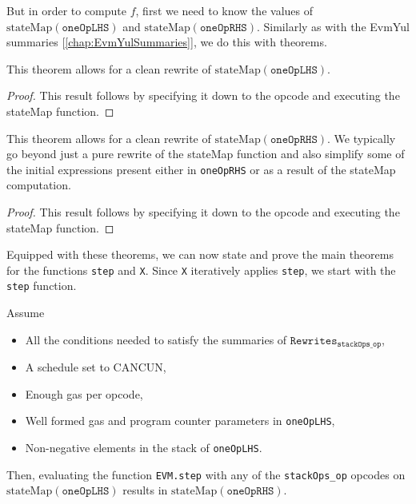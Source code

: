 But in order to compute $f$, first we need to know the values of
$\text{stateMap}(\texttt{oneOpLHS})$ and $\text{stateMap}(\texttt{oneOpRHS})$.
Similarly as with the EvmYul summaries [\ref{chap:EvmYulSummaries}], we do this
with theorems.

\begin{theorem}\label{thm:oneOpLHS_equiv}
\leanok{}
This theorem allows for a clean rewrite of $\text{stateMap}(\texttt{oneOpLHS})$.
\end{theorem}
\begin{proof}
\leanok
This result follows by specifying it down to the opcode and executing the
stateMap function.
\end{proof}

\begin{theorem}\label{thm:oneOpRHS_equiv}
\leanok{}
This theorem allows for a clean rewrite of $\text{stateMap}(\texttt{oneOpRHS})$.
We typically go beyond just a pure rewrite of the stateMap function and also
simplify some of the initial expressions present either in \texttt{oneOpRHS} or
as a result of the stateMap computation.
\end{theorem}
\begin{proof}
This result follows by specifying it down to the opcode and executing the
stateMap function.
\end{proof}

Equipped with these theorems, we can now state and prove the main theorems for
the functions \texttt{step} and \texttt{X}. Since \texttt{X} iteratively applies
\texttt{step}, we start with the \texttt{step} function.

\begin{theorem}\label{thm:step_oneOp}
\leanok
{}

Assume

\begin{itemize}
\item All the conditions needed to satisfy the summaries of
  $\texttt{Rewrites}_{\texttt{stackOps_op}}$,
\item A schedule set to CANCUN,
\item Enough gas per opcode,
\item Well formed gas and program counter parameters in \texttt{oneOpLHS},
\item Non-negative elements in the stack of \texttt{oneOpLHS}.
\end{itemize}

Then, evaluating the function \texttt{EVM.step} with any of the
\texttt{stackOps_op} opcodes on $\text{stateMap}(\texttt{oneOpLHS})$ results in
$\text{stateMap}(\texttt{oneOpRHS})$.

\end{theorem}

